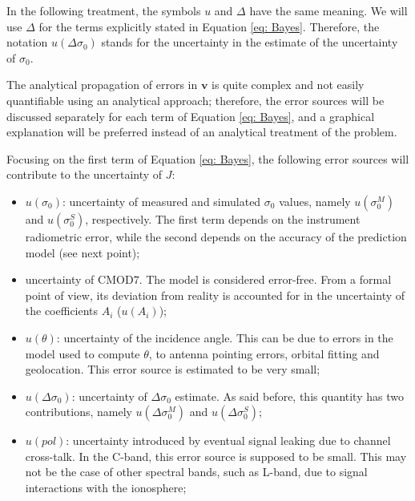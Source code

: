 In the following treatment, the symbols $u$ and $\Delta$ have the same
meaning. We will use $\Delta$ for the terms explicitly stated in Equation \ref{eq: Bayes}. Therefore, the notation $u(\Delta \sigma_{0})$ stands for the uncertainty in the estimate of the uncertainty of $\sigma_{0}$.

The analytical propagation of errors in $\mathbf{v}$ is quite complex and not
easily quantifiable using an analytical approach; therefore, the error sources
will be discussed separately for each term of Equation \ref{eq: Bayes}, and a
graphical explanation will be preferred instead of an analytical treatment of
the problem.

Focusing on the first term of Equation \ref{eq: Bayes}, the following error
sources will contribute to the uncertainty of $J$:
\begin{itemize}
	\item $u(\sigma_{0})$: uncertainty of measured and simulated $\sigma_{0}$ values, namely $u(\sigma_{0}^{M})$ and $u(\sigma_{0}^{S})$, respectively. The first term depends on the instrument radiometric error, while the second depends on the accuracy of the prediction model (see next point);
	\item uncertainty of $\mathrm{CMOD7}$. The model is considered error-free. From a formal point of view, its deviation from reality is accounted for in the uncertainty of the coefficients $A_{i}$ ($u(A_{i})$);
	\item $u(\theta)$: uncertainty of the incidence angle. This can be due to errors in the model used to compute $\theta$, to antenna pointing errors, orbital fitting and geolocation. This error source is estimated to be very small;
	\item $u(\Delta \sigma_{0})$: uncertainty of $\Delta \sigma_{0}$ estimate. As said before, this quantity has two contributions, namely $u(\Delta \sigma_{0}^{M})$ and $u(\Delta \sigma_{0}^{S})$;
	\item $u(pol)$: uncertainty introduced by eventual signal leaking due to channel cross-talk. In the C-band, this error source is supposed to be small. This may not be the case of other spectral bands, such as L-band, due to signal interactions with the ionosphere; 
\end{itemize} 

